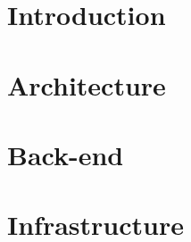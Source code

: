\documentclass[10pt]{report}
\begin{document}

\restoregeometry

\setcounter{tocdepth}{5}

\let\LaTeXStandardClearpage\clearpage
\let\clearpage\relax %

\tableofcontents
\listoffigures
\listoftables

\let\clearpage\LaTeXStandardClearpage %

\pagebreak

\chapter{Introduction}

\pagebreak

\chapter{Architecture}

\pagebreak

\chapter{Back-end}

\pagebreak

\chapter{Infrastructure}

\pagebreak

\printbibliography
\end{document}
